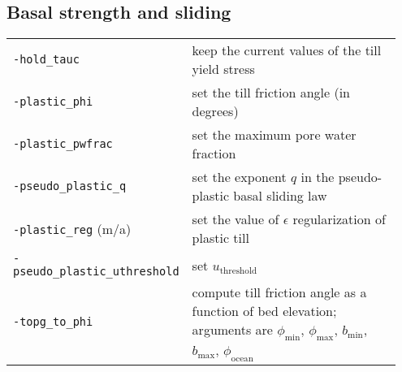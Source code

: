\documentclass[landscape]{article}
\begin{document}
\begin{textblock}{15}
\section{Basal strength and sliding}
\label{sec:basal-strength}
\begin{tabular}{@{}p{0.35\linewidth}p{0.6\linewidth}@{}}
\texttt{-hold_tauc} & keep the current values of the till yield stress\\
\texttt{-plastic_phi} & set the till friction angle (in degrees)\\
\texttt{-plastic_pwfrac} & set the maximum pore water fraction\\
\texttt{-pseudo_plastic_q} & set the exponent $q$ in the pseudo-plastic basal
sliding law\\
\texttt{-plastic_reg} (m/a) & set the value of $\epsilon$ regularization of plastic
till\\
\texttt{-pseudo_plastic_uthreshold} & set $u_{\mathrm{threshold}}$\\
\texttt{-topg_to_phi} & compute till friction angle as a function of bed
elevation; arguments are $\phi_{\mathrm{min}}$, $\phi_{\mathrm{max}}$, $b_{\mathrm{min}}$, $b_{\mathrm{max}}$, $\phi_{\mathrm{ocean}}$
\end{tabular}



\end{textblock}
\end{document}
